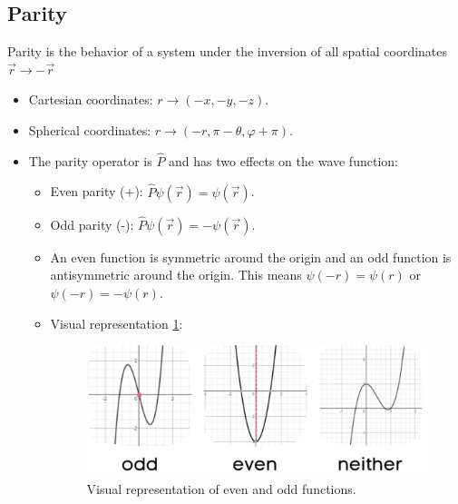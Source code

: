 \documentclass{article}
\begin{document}
\subsection{Parity}
Parity is the behavior of a system under the inversion of all spatial coordinates $\vec{r} → - \vec{r}$
\begin{itemize}
    \item Cartesian coordinates: $r → (-x, -y, -z)$. 
    \item Spherical coordinates: $r → (-r, π-θ, φ + π)$.
    \item The parity operator is $\hat{P}$ and has two effects on the wave function: 
    \begin{itemize}
        \item Even parity (+): $\hat{P}ψ(\vec{r}) = ψ(\vec{r})$.
        \item Odd parity (-): $\hat{P}ψ(\vec{r}) = -ψ(\vec{r})$.
        \item An even function is symmetric around the origin and an odd function is antisymmetric around the origin. This means $ψ(-r) = ψ(r)$ or $ψ(-r) = -ψ(r)$. 
        \item Visual representation \cref{fig: even_vs_odd_function}:
        \begin{figure}[h!]
        \centering
        \includegraphics[width = .75\textwidth]{even_vs_odd_function.png}
        \caption{Visual representation of even and odd functions.}
        \label{fig: even_vs_odd_function}
        \end{figure}
    \end{itemize} 
\end{itemize}
\end{document}
